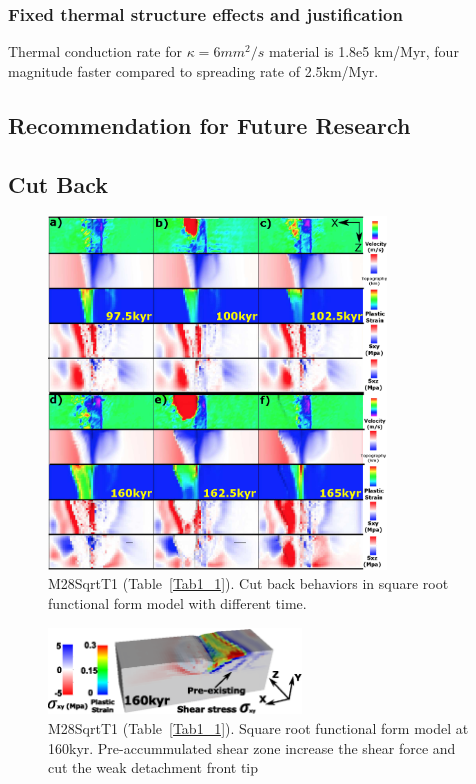 \subsubsection{Fixed thermal structure effects and justification}
Thermal conduction rate for $\kappa=6mm^{2}/s$ material is 1.8e5 km/Myr, four magnitude faster compared to spreading rate of 2.5km/Myr.
\subsection{Recommendation for Future Research}
\fi

\iffalse
\subsection{Cut Back}\label{Sec_CutBack}

\begin{figure}[h]
  \centering
    \includegraphics[width=0.8\textwidth]{./Figures/fig_Results4_4_sqrt_cut_back_with_time.eps}
  \caption{M28SqrtT1 (Table~\hyperref[Tab1_1]{\ref{Tab1_1}}). Cut back behaviors in square root functional form model with different time.}
 \label{fig_Results4_4}
\end{figure}   

\begin{figure}[h]
  \centering
    \includegraphics[width=0.6\textwidth]{./Figures/fig_Results4_5_sqrt_cut_back_pre_accummulated_shear_zone.eps}
  \caption{M28SqrtT1 (Table~\hyperref[Tab1_1]{\ref{Tab1_1}}). Square root functional form model at 160kyr. Pre-accummulated shear zone increase the shear force and cut the weak detachment front tip}
 \label{fig_Results4_5}
\end{figure}   

